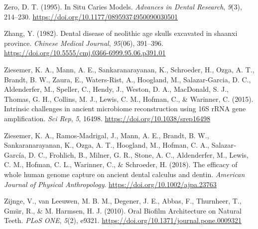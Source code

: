 \documentclass[
  letterpaper,
]{book}
\newlength{\cslhangindent}
\newlength{\cslentryspacingunit} %
\newenvironment{CSLReferences}[2] %
 {%
  \setlength{\parindent}{0pt}
  \ifodd #1
  \let\oldpar\par
  \def\par{\hangindent=\cslhangindent\oldpar}
  \fi
  \setlength{\parskip}{#2\cslentryspacingunit}
 }%
 {}
\begin{document}
\begin{CSLReferences}{1}{0}
\leavevmode{}%
Zero, D. T. (1995). In {Situ Caries Models}. \emph{Advances in Dental
Research}, \emph{9}(3), 214--230.
\url{https://doi.org/10.1177/08959374950090030501}

\leavevmode{}%
Zhang, Y. (1982). Dental disease of neolithic age skulls excavated in
shaanxi province. \emph{Chinese Medical Journal}, \emph{95}(06),
391--396. \url{https://doi.org/10.5555/cmj.0366-6999.95.06.p391.01}

\leavevmode{}%
Ziesemer, K. A., Mann, A. E., Sankaranarayanan, K., Schroeder, H., Ozga,
A. T., Brandt, B. W., Zaura, E., Waters-Rist, A., Hoogland, M.,
Salazar-Garcia, D. C., Aldenderfer, M., Speller, C., Hendy, J., Weston,
D. A., MacDonald, S. J., Thomas, G. H., Collins, M. J., Lewis, C. M.,
Hofman, C., \& Warinner, C. (2015). Intrinsic challenges in ancient
microbiome reconstruction using {16S rRNA} gene amplification. \emph{Sci
Rep}, \emph{5}, 16498. \url{https://doi.org/10.1038/srep16498}

\leavevmode{}%
Ziesemer, K. A., Ramos‐Madrigal, J., Mann, A. E., Brandt, B. W.,
Sankaranarayanan, K., Ozga, A. T., Hoogland, M., Hofman, C. A.,
Salazar‐García, D. C., Frohlich, B., Milner, G. R., Stone, A. C.,
Aldenderfer, M., Lewis, C. M., Hofman, C. L., Warinner, C., \&
Schroeder, H. (2018). The efficacy of whole human genome capture on
ancient dental calculus and dentin. \emph{American Journal of Physical
Anthropology}. \url{https://doi.org/10.1002/ajpa.23763}

\leavevmode{}%
Zijnge, V., van Leeuwen, M. B. M., Degener, J. E., Abbas, F., Thurnheer,
T., Gmür, R., \& M. Harmsen, H. J. (2010). Oral {Biofilm Architecture}
on {Natural Teeth}. \emph{PLoS ONE}, \emph{5}(2), e9321.
\url{https://doi.org/10.1371/journal.pone.0009321}

\end{CSLReferences}

\backmatter
\end{document}
